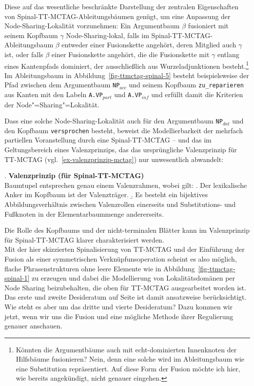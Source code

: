Diese auf das wesentliche beschränkte Darstellung der zentralen Eigenschaften von Spinal-TT-MCTAG-Ableitungsbäumen genügt, um eine Anpassung der Node-Sharing-Lokalität vorzunehmen: Ein Argumentbaum $\beta$ fusioniert mit seinem Kopfbaum $\gamma$ Node-Sharing-lokal, falls im Spinal-TT-MCTAG-Ablei\-tungs\-baum $\beta$ entweder einer Fusionskette angehört, deren Mitglied auch $\gamma$ ist, oder falls $\beta$ einer Fusionskette angehört, die die Fusionskette mit $\gamma$ entlang eines Kantenpfads dominiert, der ausschlie\ss lich aus Wurzeladjunktionen besteht.\footnote{Könnten die Argumentbäume auch mit echt-dominierten Innenknoten der Hilfsbäume fusionieren? Nein, denn eine solche  wird im Ableitungsbaum wie eine Substitution repräsentiert. Auf diese Form der Fusion möchte ich hier, wie bereits angekündigt, nicht genauer eingehen.} Im Ableitungsbaum in Abbildung~\ref{fig-ttmctag-spinal-5} besteht beispielsweise der Pfad zwischen dem Argumentbaum {\tt NP$_{acc}$} und seinem Kopfbaum {\tt zu\_reparieren} aus Kanten mit den Labeln {\tt A.VP$_{part}$} und {\tt A.VP$_{inf}$} und erfüllt damit die Kriterien der Node"=Sharing"=Lokalität. 

Dass eine solche Node-Sharing-Lokalität auch für den Argumentbaum {\tt NP$_{dat}$} und den Kopfbaum {\tt versprochen} besteht, beweist die Modellierbarkeit der mehrfach partiellen Voranstellung durch eine Spinal-TT-MCTAG -- und das im Geltungsbereich eines Valenzprinzips, das das ursprüngliche Valenzprinzip für TT-MCTAG (vgl.\ \ref{ex-valenzprinzip-mctag}) nur unwesentlich abwandelt:

\ex. \label{ex-valenzprinzip-spinal-tt-mctag}{\bf Valenzprinzip (für Spinal-TT-MCTAG)} \\ 
Baumtupel entsprechen genau einem Valenzrahmen, wobei gilt:
\a. Der lexikalische Anker im Kopfbaum ist der Valenzträger.
\b. Es besteht ein bijektives Abbildungsverhältnis zwischen Valenzrollen einerseits und Substitutions- und Fu\ss knoten in der Elementarbaummenge andererseits.

Die Rolle des Kopfbaums und der nicht-terminalen Blätter kann im Valenzprinzip für Spinal-TT-MCTAG klarer charakterisiert werden. \\  


Mit der hier skizzierten Spinalisierung von TT-MCTAG und der Einführung der Fusion als einer symmetrischen Verknüpfunsoperation scheint es also möglich, flache Phrasenstrukturen ohne leere Elemente wie in Abbildung~\ref{fig-ttmctag-spinal-1} zu erzeugen und dabei die Modellierung von Lokalitätsdomänen per Node Sharing  beizubehalten, die oben für TT-MCTAG ausgearbeitet worden ist. Das erste und zweite Desideratum auf Seite \pageref{enum-ttmctag-spinal} ist damit ansatzweise berücksichtigt. Wie steht es aber um das dritte und vierte Desideratum? Dazu kommen wir jetzt, wenn wir uns die Fusion und eine mögliche Methode ihrer Regulierung genauer anschauen.   
 

